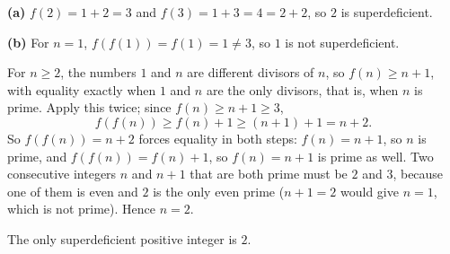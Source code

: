 \textbf{(a)} $f(2)=1+2=3$ and $f(3)=1+3=4=2+2$, so $2$ is superdeficient.

\textbf{(b)} For $n=1$, $f(f(1))=f(1)=1\ne3$, so $1$ is not superdeficient.

For $n\ge2$, the numbers $1$ and $n$ are different divisors of $n$, so $f(n)\ge n+1$, with equality exactly when $1$ and $n$ are the only divisors, that is, when $n$ is prime. Apply this twice; since $f(n)\ge n+1\ge3$,
\[f(f(n))\ge f(n)+1\ge(n+1)+1=n+2 .\]
So $f(f(n))=n+2$ forces equality in both steps: $f(n)=n+1$, so $n$ is prime, and $f(f(n))=f(n)+1$, so $f(n)=n+1$ is prime as well. Two consecutive integers $n$ and $n+1$ that are both prime must be $2$ and $3$, because one of them is even and $2$ is the only even prime ($n+1=2$ would give $n=1$, which is not prime). Hence $n=2$.

The only superdeficient positive integer is $\boxed{2}$.
